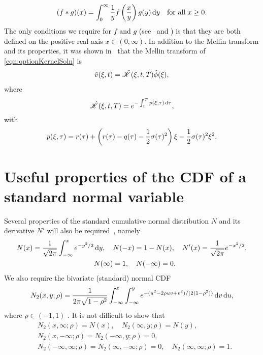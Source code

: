 	\begin{equation}
		\label{eqn:mellinConvolution}
		(f \ast g)(x) = \int_0^\infty \frac{1}{y}f\left(\frac{x}{y}\right)g(y) \, \mathrm d y \quad \text{for all } x \geq 0.
	\end{equation}
\textcolor{black}{The only conditions we require for $f$ and $g$ (see~\cite[chapter~2]{Titchmarsh1948} and \cite[chapter~11]{Poularikas2000}) is that they are both defined on the positive real axis $x \in (0,\infty)$.} In addition to the Mellin transform and its properties, it was shown in~\cite{Rodrigo2006} that the Mellin transform of \eqref{eqn:optionKernelSoln} is
\begin{align}
		\label{eqn:mellinVkernel}
		\begin{split}
		\hat v(\xi,t) &= \hat {\mathscr K}(\xi,t,T) \hat \phi(\xi), \\
		\end{split}
	\end{align}
where 
\begin{equation}
	\label{eqn:KhatA}
 \hat{\mathscr K}(\xi,t,T) = e^{-\int_t^T p(\xi,\tau) \,  \mathrm d\tau},
 \end{equation} 
with
	\begin{equation}
		\label{eqn:Khat}
		p(\xi,\tau) = r(\tau) + \left( r(\tau) - q(\tau) - \frac{1}{2}\sigma(\tau)^2 \right)\xi - \frac{1}{2}\sigma(\tau)^2\xi^2.
	\end{equation}

\section{Useful properties of the CDF of a standard normal variable}
\label{subsec:cdfproperties}
Several properties of the \textcolor{black}{standard} cumulative normal distribution $N$ and its derivative $N'$ will also be required~\cite[pp. 235--239]{Jeff1995}, namely
	\begin{equation}
		\begin{split}
		N(x) = \fr{1}{\sqrt{2\pi}}\int_{-\infty}^x e^{-y^2/2} & \, \d y, \quad %
		N(-x) = 1 - N(x), \quad
		N'(x) = \fr{1}{\sqrt{2\pi}}e^{-x^2/2} \label{eqn:Nprime}, \\
		&N(\infty) = 1, \quad N(-\infty) = 0.
		\end{split}
	\end{equation}
We also require the bivariate (standard) normal CDF~\cite{Genz2004}
	\begin{equation}
		\label{eqn:N2}
		N_2(x,y;\rho) = \frac{1}{2\pi\sqrt{1-\rho^2}}\int_{-\infty}^x\int_{-\infty}^y e^{-(u^2-2\rho uv + v^2)/(2(1-\rho^2))} \, \mathrm d v \, \mathrm d u,
	\end{equation}
where $\rho \in (-1,1)$ . It is not difficult to show that	
	\begin{equation}
		\label{eqn:Nspecial}
		\begin{split}
		&N_2(x,\infty;\rho) = N(x), \quad N_2(\infty,y;\rho) = N(y),\\
		&N_2(x,-\infty;\rho) = N_2(-\infty,y;\rho) = 0, \\
		&N_2(-\infty,\infty;\rho) = N_2(\infty,-\infty;\rho) = 0, \quad N_2(\infty,\infty;\rho) = 1.
		\end{split}
	\end{equation}
